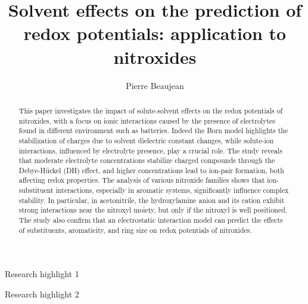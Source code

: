 \documentclass[review,preprint]{elsarticle}
\begin{document}
	
	\begin{frontmatter}
		
		
		\title{Solvent effects on the prediction of redox potentials: application to nitroxides}
		
		\author[1]{Pierre Beaujean}
		
		
		
		
		\begin{abstract}
			This paper investigates the impact of solute-solvent effects on the redox potentials of nitroxides, with a focus on ionic interactions caused by the presence of electrolytes found in different environment such as batteries. Indeed the Born model highlights the stabilization of charges due to solvent dielectric constant changes, while solute-ion interactions, influenced by electrolyte presence, play a crucial role. The study reveals that moderate electrolyte concentrations stabilize charged compounds through the Debye-Hückel (DH) effect, and higher concentrations lead to ion-pair formation, both affecting redox properties. The analysis of various nitroxide families shows that ion-substituent interactions, especially in aromatic systems, significantly influence complex stability. In particular, in acetonitrile, the hydroxylamine anion and its cation exhibit strong interactions near the nitroxyl moiety, but only if the nitroxyl is well positioned. The study also confirm that an electrostatic interaction model can predict the effects of substituents, aromaticity, and ring size on redox potentials of nitroxides. 
		\end{abstract}
		
		
		\begin{graphicalabstract}
		\end{graphicalabstract}
		
		\begin{highlights}
			\item Research highlight 1
			\item Research highlight 2
		\end{highlights}
		

\end{frontmatter}
\end{document}
